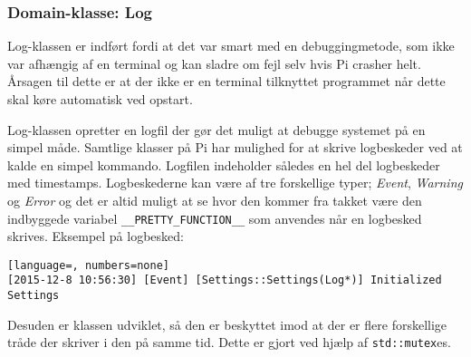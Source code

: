 \subsubsection{Domain-klasse: Log} \label{sec:log_klasse}
Log-klassen er indført fordi at det var smart med en debuggingmetode, som ikke var afhængig af en terminal og kan sladre om fejl selv hvis Pi crasher helt.
Årsagen til dette er at der ikke er en terminal tilknyttet programmet når dette skal køre automatisk ved opstart.

Log-klassen opretter en logfil der gør det muligt at debugge systemet på en simpel måde. Samtlige klasser på Pi har mulighed for at skrive logbeskeder ved at kalde en simpel kommando. Logfilen indeholder således en hel del logbeskeder med timestamps. Logbeskederne kan være af tre forskellige typer; \textit{Event}, \textit{Warning} og \textit{Error} og det er altid muligt at se hvor den kommer fra takket være den indbyggede variabel \texttt{\_\_PRETTY\_FUNCTION\_\_} \cite{lib:prettyf} som anvendes når en logbesked skrives. Eksempel på logbesked:
\vspace{10 pt}
\begin{lstlisting}[language=, numbers=none]
[2015-12-8 10:56:30] [Event] [Settings::Settings(Log*)] Initialized Settings
\end{lstlisting}

Desuden er klassen udviklet, så den er beskyttet imod at der er flere forskellige tråde der skriver i den på samme tid. Dette er gjort ved hjælp af \texttt{std::mutex}es.